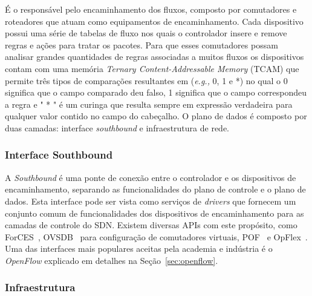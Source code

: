 É o responsável pelo encaminhamento dos fluxos, composto por comutadores e roteadores que atuam como equipamentos de encaminhamento. Cada dispositivo possui uma série de tabelas de fluxo nos quais o controlador insere e remove regras e ações para tratar os pacotes. Para que esses comutadores possam analisar grandes quantidades de regras associadas a muitos fluxos os dispositivos contam com uma memória \emph{Ternary  Content-Addressable  Memory} (TCAM) que permite três tipos de comparações resultantes em (\textit{e.g.,} 0, 1 e *) no qual o 0 significa que o campo comparado deu falso, 1 significa que o campo correspondeu a regra e  " * " é um curinga que resulta sempre em expressão verdadeira para qualquer valor contido no campo do cabeçalho. O plano de dados é composto por duas camadas: interface \textit{southbound} e infraestrutura de rede.

\subsubsection{Interface Southbound}

A \textit{Southbound} é uma ponte de conexão entre o controlador e os dispositivos de encaminhamento, separando as funcionalidades do plano de controle e o plano de dados. Esta interface pode ser vista como serviços de \textit{drivers} que fornecem um conjunto comum de funcionalidades dos dispositivos de encaminhamento para as camadas de controle do SDN. Existem diversas APIs com este propósito, como ForCES~\cite{doria2010forwarding}, OVSDB~\cite{pfaff2013open} para configuração de comutadores virtuais, POF~\cite{song2013protocol} e OpFlex~\cite{smith2014opflex}. Uma das interfaces mais populares aceitas pela academia e indústria é o \textit{OpenFlow} explicado em detalhes na Seção~\ref{sec:openflow}.

\subsubsection{Infraestrutura}%

